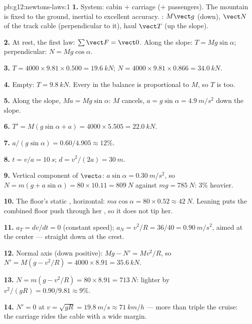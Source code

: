 \begin{solution}{pb:g12:newtons-laws:1}
\textbf{1.} System: cabin $+$ carriage ($+$ passengers). The mountain
is fixed to the ground, inertial to excellent accuracy. :
 $M\vect g$ (down),  $\vect N$ of the track cable
(perpendicular to it), haul  $\vect T$ (up the slope).

\textbf{2.} At rest, the first law: $\sum \vect F = \vect 0$. Along
the slope: $T = Mg\sin\alpha$; perpendicular: $N = Mg\cos\alpha$.

\textbf{3.} $T = 4000 \times 9.81 \times 0.500 = \qty{19.6}{kN}$;
$N = 4000 \times 9.81 \times 0.866 = \qty{34.0}{kN}$.

\textbf{4.} Empty: $T = \qty{9.8}{kN}$. Every  in the balance is
proportional to $M$, so $T$ is too.

\textbf{5.} Along the slope, $Ma = Mg\sin\alpha$: $M$ cancels,
$a = g\sin\alpha = \qty{4.9}{m/s^2}$ down the slope.

\textbf{6.} $T' = M(g\sin\alpha + a) = 4000 \times 5.505 =
\qty{22.0}{kN}$.

\textbf{7.} $a/(g\sin\alpha) = 0.60/4.905 \approx 12\%$.

\textbf{8.} $t = v/a = \qty{10}{s}$; $d = v^2/(2a) = \qty{30}{m}$.

\textbf{9.} Vertical component of $\vect a$: $a\sin\alpha =
\qty{0.30}{m/s^2}$, so $N = m(g + a\sin\alpha) = 80 \times 10.11 =
\qty{809}{N}$ against $mg = \qty{785}{N}$: $3\%$ heavier.

\textbf{10.} The floor's static , horizontal:
$ma\cos\alpha = 80 \times 0.52 \approx \qty{42}{N}$. Leaning puts the
combined floor push through her , so it does not tip
her.

\textbf{11.} $a_T = dv/dt = 0$ (constant speed);
$a_N = v^2/R = 36/40 = \qty{0.90}{m/s^2}$, aimed at the center ---
straight down at the crest.

\textbf{12.} Normal axis (down positive): $Mg - N' = Mv^2/R$, so
$N' = M(g - v^2/R) = 4000 \times 8.91 = \qty{35.6}{kN}$.

\textbf{13.} $N = m(g - v^2/R) = 80 \times 8.91 = \qty{713}{N}$:
lighter by $v^2/(gR) = 0.90/9.81 \approx 9\%$.

\textbf{14.} $N' = 0$ at $v = \sqrt{gR} = \qty{19.8}{m/s} \approx
\qty{71}{km/h}$ --- more than triple the cruise: the carriage rides
the cable with a wide margin.


\end{solution}
